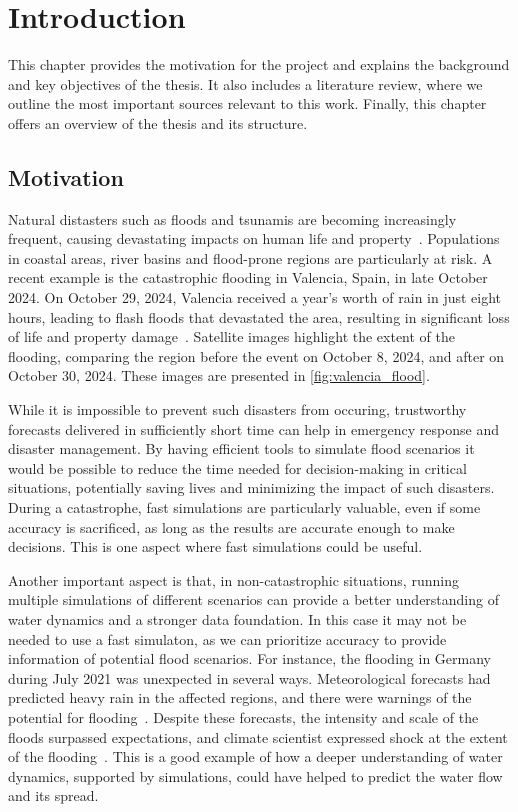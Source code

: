 \chapter{Introduction}
This chapter provides the motivation for the project and explains the background and key objectives of the thesis.
It also includes a literature review, where we outline the most important sources relevant to this work.
Finally, this chapter offers an overview of the thesis and its structure.

\section{Motivation}
Natural distasters such as floods and tsunamis are becoming increasingly frequent, causing devastating impacts on human life and property~\cite{najibi2018global_floods}.
Populations in coastal areas, river basins and flood-prone regions are particularly at risk.
A recent example is the catastrophic flooding in Valencia, Spain, in late October 2024.
On October 29, 2024, Valencia received a year's worth of rain in just eight hours, leading to flash floods that devastated the area, resulting in significant loss of life and property damage~\cite{valencia_flood_disaster_esa}.
Satellite images highlight the extent of the flooding, comparing the region before the event on October 8, 2024, and after on October 30, 2024.
These images are presented in \autoref{fig:valencia_flood}.

While it is impossible to prevent such disasters from occuring, trustworthy forecasts delivered in sufficiently short time can help in emergency response and disaster management.
By having efficient tools to simulate flood scenarios it would be possible to reduce the time needed for decision-making in critical situations, potentially saving lives and minimizing the impact of such disasters.
During a catastrophe, fast simulations are particularly valuable, even if some accuracy is sacrificed, as long as the results are accurate enough to make decisions.
This is one aspect where fast simulations could be useful.

Another important aspect is that, in non-catastrophic situations, running multiple simulations of different scenarios can provide a better understanding of water dynamics and a stronger data foundation.
In this case it may not be needed to use a fast simulaton, as we can prioritize accuracy to provide information of potential flood scenarios.
For instance, the flooding in Germany during July 2021 was unexpected in several ways.
Meteorological forecasts had predicted heavy rain in the affected regions, and there were warnings of the potential for flooding~\cite{fathom_floods_2021}.
Despite these forecasts, the intensity and scale of the floods surpassed expectations, and climate scientist expressed shock at the extent of the flooding~\cite{guardian_floods_2021}.
This is a good example of how a deeper understanding of water dynamics, supported by simulations, could have helped to predict the water flow and its spread.

